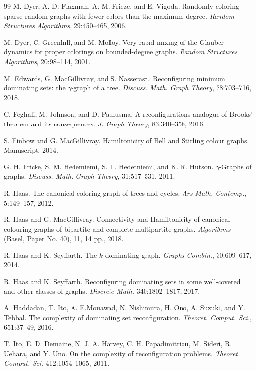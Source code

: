 \documentclass[12pt]{article}%
\begin{document}
\begin{thebibliography}{99}
M. Dyer, A. D. Flaxman, A. M. Frieze, and E. Vigoda.
Randomly coloring sparse random graphs with fewer colors than the maximum
degree. \emph{Random Structures Algorithms}, 29:450--465,\textbf{ }2006.

M. Dyer, C. Greenhill, and M. Molloy. Very rapid mixing of
the Glauber dynamics for proper colorings on bounded-degree graphs.
\emph{Random Structures Algorithms}, 20:98--114, 2001.

M. Edwards, G. MacGillivray, and S.
Nasserasr.\ Reconfiguring minimum dominating sets: the $\gamma$-graph of a
tree. \emph{Discuss. Math. Graph Theory}, 38:703--716, 2018.

C. Feghali, M. Johnson, and D. Paulusma. A reconfigurations
analogue of Brooks' theorem and its consequences. \emph{J. Graph Theory},
83:340--358, 2016.

S. Finbow and G. MacGillivray. Hamiltonicity of Bell and
Stirling colour graphs. Manuscript, 2014.

G. H. Fricke, S. M. Hedemiemi, S. T. Hedetniemi, and K. R.
Hutson. $\gamma$-Graphs of graphs.\emph{ Discuss. Math. Graph Theory},
31:517--531, 2011.

R. Haas. The canonical coloring graph of trees and
cycles.\emph{ Ars Math. Contemp.}, 5:149--157, 2012.

R. Haas and G. MacGillivray. Connectivity and
Hamiltonicity of canonical colouring graphs of bipartite and complete
multipartite graphs. \emph{Algorithms} (Basel, Paper No. 40), 11, 14 pp., 2018.

R. Haas and K. Seyffarth. The $k$-dominating graph.
\emph{Graphs Combin.}, 30:609--617, 2014.

R. Haas and K. Seyffarth. Reconfiguring dominating sets
in some well-covered and other classes of graphs. \emph{Discrete Math.}
340:1802--1817, 2017.

A. Haddadan, T. Ito, A. E.Mouawad, N. Nishimura, H.
Ono, A. Suzuki, and Y. Tebbal. The complexity of dominating set
reconfiguration. \emph{Theoret. Comput. Sci.}, 651:37--49, 2016.

T. Ito, E. D. Demaine, N. J. A. Harvey, C. H.
Papadimitriou, M. Sideri, R. Uehara, and Y. Uno. On the complexity of
reconfiguration problems. \emph{Theoret. Comput. Sci.} 412:1054--1065, 2011.


\end{thebibliography}
\end{document}
